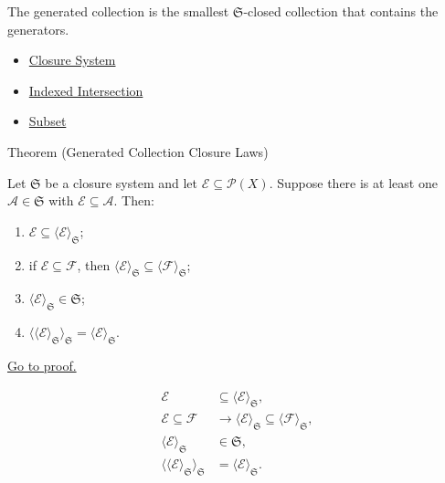 \begin{remark*}[Interpretation]
The generated collection is the smallest $\mathfrak{S}$-closed collection that
contains the generators.
\end{remark*}


\begin{dependencies}
\begin{itemize}
  \item \hyperref[def:closure-system]{Closure System}
  \item \hyperref[def:indexed-intersection]{Indexed Intersection}
  \item \hyperref[def:subset]{Subset}
\end{itemize}
\end{dependencies}

\begin{theorembox}{Theorem (Generated Collection Closure Laws)}
\begin{theorem}\label{thm:generated-collection-closure-laws}
Let $\mathfrak{S}$ be a closure system and let
$\mathcal{E}\subseteq\mathcal{P}(X)$.  Suppose there is at least one
$\mathcal{A}\in\mathfrak{S}$ with $\mathcal{E}\subseteq\mathcal{A}$.  Then:
\begin{enumerate}[label=(\roman*)]
\item $\mathcal{E}\subseteq\langle\mathcal{E}\rangle_{\mathfrak{S}}$;
\item if $\mathcal{E}\subseteq\mathcal{F}$, then
      $\langle\mathcal{E}\rangle_{\mathfrak{S}}
      \subseteq
      \langle\mathcal{F}\rangle_{\mathfrak{S}}$;
\item $\langle\mathcal{E}\rangle_{\mathfrak{S}}\in\mathfrak{S}$;
\item
      $\langle\langle\mathcal{E}\rangle_{\mathfrak{S}}\rangle_{\mathfrak{S}}
      =
      \langle\mathcal{E}\rangle_{\mathfrak{S}}$.
\end{enumerate}
\hyperref[prf:generated-collection-closure-laws]{Go to proof.}
\end{theorem}
\end{theorembox}

\begin{remark*}
\[
\begin{aligned}
\mathcal E&\subseteq\langle\mathcal E\rangle_{\mathfrak S},\\
\mathcal E\subseteq\mathcal F&\to
\langle\mathcal E\rangle_{\mathfrak S}\subseteq
\langle\mathcal F\rangle_{\mathfrak S},\\
\langle\mathcal E\rangle_{\mathfrak S}&\in\mathfrak S,\\
\langle\langle\mathcal E\rangle_{\mathfrak S}\rangle_{\mathfrak S}
&=
\langle\mathcal E\rangle_{\mathfrak S}.
\end{aligned}
\]
\end{remark*}

